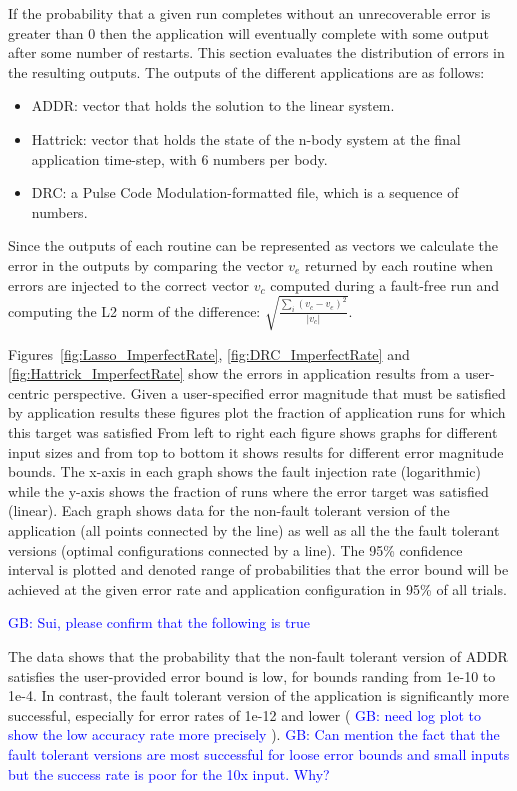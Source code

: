 \documentclass{sig-alternate}
\newcommand{\greg}[1]{%
  \textcolor{blue}{GB: #1}
}
\begin{document}
{If the probability that a given run completes without an unrecoverable error is greater than 0 then the application will eventually complete with some output after some number of restarts.
This section evaluates the distribution of errors in the resulting outputs.
The outputs of the different applications are as follows:
\begin{itemize}
    \item ADDR: vector that holds the solution to the linear system.
    \item Hattrick: vector that holds the state of the n-body system at the final application time-step, with 6 numbers per body.
    \item DRC: a Pulse Code Modulation-formatted file, which is a sequence of numbers.
\end{itemize}
Since the outputs of each routine can be represented as vectors we calculate the error in the outputs by comparing the vector $v_e$ returned by each routine when errors are injected to the correct vector $v_c$ computed during a fault-free run and computing the L2 norm of the difference: $\sqrt{\frac{\sum_{i} (v_c-v_e)^2}{\left| v_c \right|}}$.

Figures~\ref{fig:Lasso_ImperfectRate}, \ref{fig:DRC_ImperfectRate} and \ref{fig:Hattrick_ImperfectRate} show the errors in application results from a user-centric perspective.
Given a user-specified error magnitude that must be satisfied by application results these figures plot the fraction of application runs for which this target was satisfied
From left to right each figure shows graphs for different input sizes and from top to bottom it shows results for different error magnitude bounds.
The x-axis in each graph shows the fault injection rate (logarithmic) while the y-axis shows the fraction of runs where the error target was satisfied (linear).
Each graph shows data for the non-fault tolerant version of the application (all points connected by the line) as well as all the the fault tolerant versions (optimal configurations connected by a line).
The 95\% confidence interval is plotted and denoted range of probabilities that the error bound will be achieved at the given error rate and application configuration in 95\% of all trials.

\greg{Sui, please confirm that the following is true}
The data shows that the probability that the non-fault tolerant version of ADDR satisfies the user-provided error bound is low, for bounds randing from 1e-10 to 1e-4.
In contrast, the fault tolerant version of the application is significantly more successful, especially for error rates of 1e-12 and lower (\greg{need log plot to show the low accuracy rate more precisely}).
\greg{Can mention the fact that the fault tolerant versions are most successful for loose error bounds and small inputs but the success rate is poor for the 10x input. Why?}

}
\end{document}
